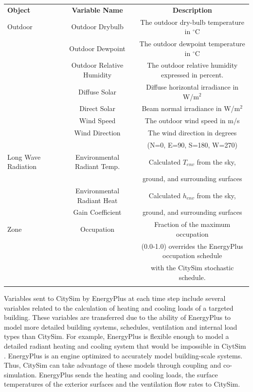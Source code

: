 \documentclass{tBPS2e}
\theoremstyle{plain}
\theoremstyle{definition}
\theoremstyle{remark}
\begin{document}
\begin{table}[H]
{\begin{tabular}[l]{@{}lcc}\toprule
  \bf{Object} &  \bf{Variable Name} & \bf{Description} \\
\colrule
  Outdoor & Outdoor Drybulb & The outdoor dry-bulb temperature in $^{\circ}\mathrm{C}$ \\
 & Outdoor Dewpoint & The outdoor dewpoint temperature in $^{\circ}\mathrm{C}$ \\
 & Outdoor Relative Humidity & The outdoor relative humidity expressed in percent. \\
 & Diffuse Solar & Diffuse horizontal irradiance in W/m$^2$ \\
 & Direct Solar & Beam normal irradiance in W/m$^2$ \\
 & Wind Speed & The outdoor wind speed in m/s \\
 & Wind Direction & The wind direction in degrees\\&&  (N=0, E=90, S=180, W=270) \\
 \hline
 Long Wave Radiation & Environmental Radiant Temp. & Calculated $T_{env}$ from the sky,\\&& ground, and surrounding surfaces \\
 & Environmental Radiant Heat  & Calculated $h_{env}$ from the sky,\\
 & Gain Coefficient & ground, and surrounding surfaces \\

 \hline
Zone & Occupation & Fraction of the maximum occupation\\&& (0.0-1.0) overrides the EnergyPlus occupation schedule\\&&  with the CitySim stochastic schedule. \\
\botrule
\end{tabular}}
\label{FMUimports}
\end{table}

Variables sent to CitySim by EnergyPlus at each time step include several
variables related to the calculation of heating and cooling loads of a
targeted building. These variables are transferred due to the ability of
EnergyPlus to model more detailed building systems, schedules, ventilation and
internal load types than CitySim. For example, EnergyPlus is flexible enough
to model a detailed radiant heating and cooling system that would be
impossible in CiytSim \citep{barbara:2015tz}. EnergyPlus is an engine
optimized to accurately model building-scale systems. Thus, CitySim can take 
advantage of these models through coupling and co-simulation. EnergyPlus sends
the heating and cooling loads, the surface temperatures of the exterior
surfaces and the ventilation flow rates to CitySim.
\end{document}
